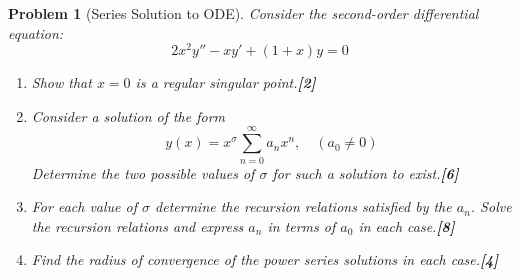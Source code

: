 \documentclass[a4paper]{article}
\theoremstyle{new}
\newtheorem{qns}{Problem}[section]
\begin{document}
\newpage
\begin{qns}[Series Solution to ODE]
Consider the second-order differential equation:
$$2x^2y''-xy'+(1+x)y=0$$
\begin{enumerate}[label=(\alph*)]
\item Show that $x = 0$ is a regular singular point.\hfill\textbf{[2]}
\item Consider a solution of the form
$$y(x)=x^\sigma\sum_{n=0}^\infty a_nx^n,\quad (a_0\neq 0)$$
Determine the two possible values of $\sigma$ for such a solution to exist.\hfill\textbf{[6]}
\item For each value of $\sigma$ determine the recursion relations satisfied by the $a_n$. Solve the recursion relations and express $a_n$ in terms of $a_0$ in each case.\hfill\textbf{[8]}
\item Find the radius of convergence of the power series solutions in each case.\hfill\textbf{[4]}
\end{enumerate}
\end{qns}
\end{document}
